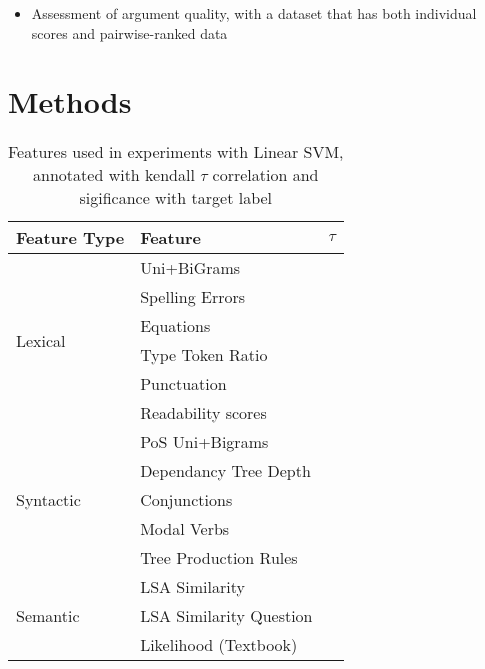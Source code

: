 \documentclass[runningheads]{llncs}
\begin{document}
\begin{itemize}

	\item \cite{toledo_automatic_2019} Assessment of argument quality, with a 
	dataset that has both individual scores 
	and pairwise-ranked data 
	
\end{itemize}
  




\section{Methods}


\begin{table}
\begin{tabular}{ |l|l|l|}
	\hline
	Feature Type & Feature & $\tau$ \\
	\hline
	\multirow{6}{*}{Lexical} 
	& Uni+BiGrams & \\
	& Spelling Errors &  \\
	& Equations & \\
	& Type Token Ratio &  \\
	& Punctuation &\\
	& Readability scores&\\
	\hline
	\multirow{5}{*}{Syntactic} 
	& PoS Uni+Bigrams &   \\
	& Dependancy Tree Depth  & \\
	& Conjunctions  & \\ 
	& Modal Verbs & \\ 
	& Tree Production Rules &\\
	\hline
	\multirow{3}{*}{Semantic} 
	& LSA Similarity &  \\
	& LSA Similarity Question & \\
	& Likelihood (Textbook) & \\ 
	\hline
\end{tabular}

\caption{Features used in experiments with Linear SVM, annotated with 
	kendall $\tau$ correlation and sigificance with target label}
\label{tab:features}
\end{table}
\end{document}
